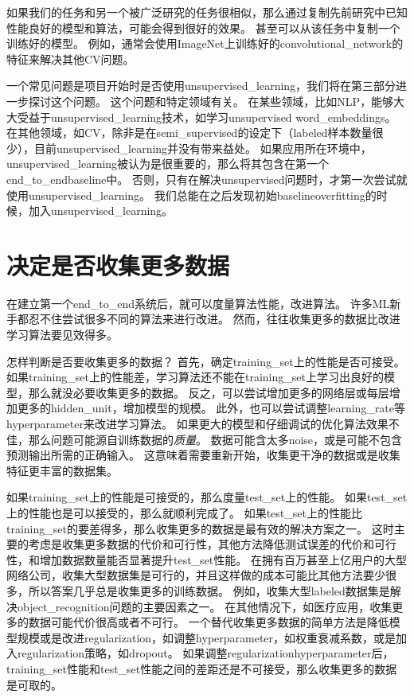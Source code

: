 如果我们的任务和另一个被广泛研究的任务很相似，那么通过复制先前研究中已知性能良好的模型和算法，可能会得到很好的效果。
甚至可以从该任务中复制一个训练好的模型。
例如，通常会使用ImageNet上训练好的\gls{convolutional_network}的特征来解决其他\gls{CV}问题\citep{girshickregion}。


一个常见问题是项目开始时是否使用\gls{unsupervised_learning}，我们将在第三部分进一步探讨这个问题。
 这个问题和特定领域有关。
在某些领域，比如\gls{NLP}，能够大大受益于\gls{unsupervised_learning}技术，如学习\gls{unsupervised} \gls{word_embeddings}。
在其他领域，如\gls{CV}，除非是在\gls{semi_supervised}的设定下（\gls{labeled}样本数量很少）\citep{Kingma-et-al-NIPS2014,Rasmus-et-al-arxiv2015}，目前\gls{unsupervised_learning}并没有带来益处。
如果应用所在环境中，\gls{unsupervised_learning}被认为是很重要的，那么将其包含在第一个\gls{end_to_end}\gls{baseline}中。
否则，只有在解决\gls{unsupervised}问题时，才第一次尝试就使用\gls{unsupervised_learning}。
我们总能在之后发现初始\gls{baseline}\gls{overfitting}的时候，加入\gls{unsupervised_learning}。

\section{决定是否收集更多数据}
\label{sec:determining_whether_to_gather_more_data}

在建立第一个\gls{end_to_end}系统后，就可以度量算法性能，改进算法。
许多\gls{ML}新手都忍不住尝试很多不同的算法来进行改进。
然而，往往收集更多的数据比改进学习算法要见效得多。

怎样判断是否要收集更多的数据？
首先，确定\gls{training_set}上的性能是否可接受。
如果\gls{training_set}上的性能差，学习算法还不能在\gls{training_set}上学习出良好的模型，那么就没必要收集更多的数据。
反之，可以尝试增加更多的网络层或每层增加更多的\gls{hidden_unit}，增加模型的规模。
此外，也可以尝试调整\gls{learning_rate}等\gls{hyperparameter}来改进学习算法。
如果更大的模型和仔细调试的优化算法效果不佳，那么问题可能源自训练数据的\emph{质量}。
数据可能含太多\gls{noise}，或是可能不包含预测输出所需的正确输入。
这意味着需要重新开始，收集更干净的数据或是收集特征更丰富的数据集。


如果\gls{training_set}上的性能是可接受的，那么度量\gls{test_set}上的性能。
如果\gls{test_set}上的性能也是可以接受的，那么就顺利完成了。
如果\gls{test_set}上的性能比\gls{training_set}的要差得多，那么收集更多的数据是最有效的解决方案之一。
这时主要的考虑是收集更多数据的代价和可行性，其他方法降低测试误差的代价和可行性，和增加数据数量能否显著提升\gls{test_set}性能。
在拥有百万甚至上亿用户的大型网络公司，收集大型数据集是可行的，并且这样做的成本可能比其他方法要少很多，所以答案几乎总是收集更多的训练数据。
例如，收集大型\gls{labeled}数据集是解决\gls{object_recognition}问题的主要因素之一。
在其他情况下，如医疗应用，收集更多的数据可能代价很高或者不可行。
一个替代收集更多数据的简单方法是降低模型规模或是改进\gls{regularization}，如调整\gls{hyperparameter}，如权重衰减系数，或是加入\gls{regularization}策略，如\gls{dropout}。
如果调整\gls{regularization}\gls{hyperparameter}后，\gls{training_set}性能和\gls{test_set}性能之间的差距还是不可接受，那么收集更多的数据是可取的。


